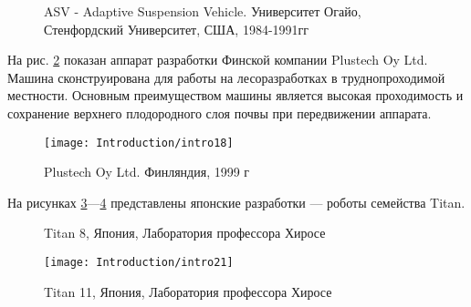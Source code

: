 \begin{figure}[ht]
	\begin{minipage}[ht]{0.49\linewidth}
	\end{minipage}
	\hfill
	\begin{minipage}[ht]{0.49\linewidth}
	\end{minipage}
	\caption{ASV - Adaptive Suspension Vehicle. Университет Огайо, Стенфордский Университет, США, 1984-1991гг}
	\label{img:ASV}  
\end{figure}

На рис. \ref{img:Plustech} показан аппарат разработки Финской компании Plustech Oy Ltd. Машина сконструирована для работы на лесоразработках в труднопроходимой местности. Основным преимуществом машины является высокая проходимость и сохранение верхнего плодородного слоя почвы при передвижении аппарата.

\begin{figure}[ht]
	\centering
	\texttt{[image: Introduction/intro18]}
	\caption{Plustech Oy Ltd. Финляндия, 1999 г}
	\label{img:Plustech}
\end{figure}

На рисунках \ref{img:titan}---\ref{img:titan2} представлены японские разработки --- роботы семейства Titan.

\begin{figure}[ht]
	\begin{minipage}[ht]{0.49\linewidth}
	\end{minipage}
	\hfill
	\begin{minipage}[ht]{0.49\linewidth}
	\end{minipage}
	\caption{Titan 8, Япония, Лаборатория профессора Хиросе}
	\label{img:titan}  
\end{figure}

\begin{figure}[ht]
	\centering
	\texttt{[image: Introduction/intro21]}
	\caption{Titan 11, Япония, Лаборатория профессора Хиросе}
	\label{img:titan2}
\end{figure}


